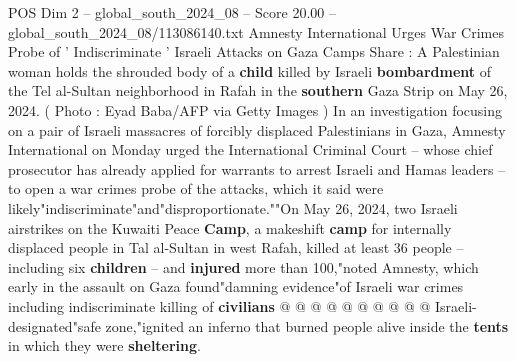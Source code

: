 \begin{textsample}{POS Dim 2 – global\_south\_2024\_08 – Score 20.00 – global\_south\_2024\_08/113086140.txt}  \label{ex:f2_pos_340}
Amnesty International Urges War Crimes Probe of ' Indiscriminate ' Israeli Attacks on Gaza Camps Share : A Palestinian woman holds the shrouded body of a \textbf{child} killed by Israeli \textbf{bombardment} of the Tel al-Sultan neighborhood in Rafah in the \textbf{southern} Gaza Strip on May 26, 2024. ( Photo : Eyad Baba/AFP via Getty Images ) In an investigation focusing on a pair of Israeli massacres of forcibly displaced Palestinians in Gaza, Amnesty International on Monday urged the International Criminal Court -- whose chief prosecutor has already applied for warrants to arrest Israeli and Hamas leaders -- to open a war crimes probe of the attacks, which it said were likely"indiscriminate"and"disproportionate.""On May 26, 2024, two Israeli airstrikes on the Kuwaiti Peace \textbf{Camp}, a makeshift \textbf{camp} for internally displaced people in Tal al-Sultan in west Rafah, killed at least 36 people -- including six \textbf{children} -- and \textbf{injured} more than 100,"noted Amnesty, which early in the assault on Gaza found"damning evidence"of Israeli war crimes including indiscriminate killing of \textbf{civilians} @ @ @ @ @ @ @ @ @ @ Israeli-designated"safe zone,"ignited an inferno that burned people alive inside the \textbf{tents} in which they were \textbf{sheltering}.

\end{textsample}
